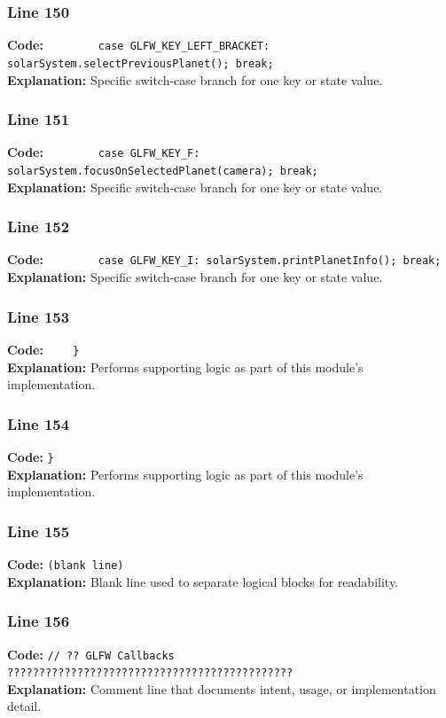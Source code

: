 \documentclass[11pt,a4paper]{article}
\begin{document}
\subsubsection*{Line 150}
\textbf{Code:} \verb|        case GLFW_KEY_LEFT_BRACKET:  solarSystem.selectPreviousPlanet(); break;|\\
\textbf{Explanation:} Specific switch-case branch for one key or state value.

\subsubsection*{Line 151}
\textbf{Code:} \verb|        case GLFW_KEY_F: solarSystem.focusOnSelectedPlanet(camera); break;|\\
\textbf{Explanation:} Specific switch-case branch for one key or state value.

\subsubsection*{Line 152}
\textbf{Code:} \verb|        case GLFW_KEY_I: solarSystem.printPlanetInfo(); break;|\\
\textbf{Explanation:} Specific switch-case branch for one key or state value.

\subsubsection*{Line 153}
\textbf{Code:} \verb|    }|\\
\textbf{Explanation:} Performs supporting logic as part of this module's implementation.

\subsubsection*{Line 154}
\textbf{Code:} \verb|}|\\
\textbf{Explanation:} Performs supporting logic as part of this module's implementation.

\subsubsection*{Line 155}
\textbf{Code:} \texttt{(blank line)}\\
\textbf{Explanation:} Blank line used to separate logical blocks for readability.

\subsubsection*{Line 156}
\textbf{Code:} \verb|// ?? GLFW Callbacks ?????????????????????????????????????????????|\\
\textbf{Explanation:} Comment line that documents intent, usage, or implementation detail.
\end{document}
